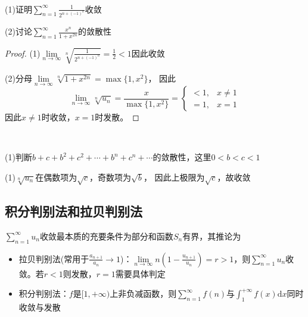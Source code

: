 ~

\begin{exercise}[仅能用根式判别法]
  (1)证明$\sum\limits_{n = 1}^{\infty}\frac{1}{2^{n + (-1)^n}}$收敛

  (2)讨论$\sum\limits_{n = 1}^{\infty} \frac{x^n}{1 + x^{2n}}$的敛散性
\end{exercise}

\begin{proof}
  (1)$\lim \limits _{n \rightarrow \infty} \sqrt[n]{\frac{1}{2^{n+(-1)^n}}} = \frac{1}{2} < 1$因此收敛

  (2)分母$\lim \limits _{n \rightarrow \infty} \sqrt[n]{1 + x^{2n}} = \max \{1,x^2\}$，
  因此
  \begin{equation*}
    \lim \limits _{n \rightarrow \infty} \sqrt[n]{u_n} = \frac{x}{\max \{1,x^2\}} =
    \begin{cases}
      < 1, & x \neq 1\\
      =1, & x = 1
    \end{cases}
  \end{equation*}
  因此$x \neq 1$时收敛，$x = 1$时发散。
\end{proof}


~

\begin{exercise}[根式判别法上下极限]
  (1)判断$b + c + b^2 + c^2 + \cdots + b^n + c^n + \cdots$的敛散性，这里$0 < b < c < 1$
\end{exercise}

\begin{solution}
  (1)$\sqrt[n]{u_n}$在偶数项为$\sqrt{c}$，奇数项为$\sqrt{b}$，
  因此上极限为$\sqrt{c}$，故收敛
\end{solution}

\subsection{积分判别法和拉贝判别法}

\begin{theorem}[积分判别法与拉贝判别法]
  $\sum\limits_{n = 1}^{\infty}u_n$收敛最本质的充要条件为部分和函数$S_n$有界，其推论为
  \begin{itemize}
  \item 拉贝判别法(常用于$\frac{a_{n+1}}{a_n}\rightarrow 1$)：$\lim \limits _{n \rightarrow \infty} n(1 - \frac{u_{n+1}}{u_n}) = r > 1$，则$\sum\limits_{n = 1}^{\infty} u_n$收敛。若$r < 1$则发散，$r = 1$需要具体判定
  \item 积分判别法：$f$是$[1,+\infty)$上非负减函数，则$\sum\limits_{n = 1}^{\infty}f(n)$与$\int_1^{+\infty}f(x)\mathrm{d}x$同时收敛与发散
  \end{itemize}
\end{theorem}

